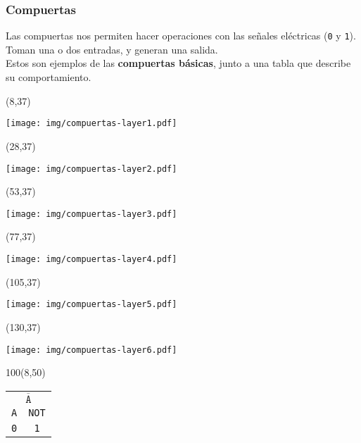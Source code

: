 \documentclass[aspectratio=169]{beamer}
\begin{document}
\begin{frame}[fragile,t]
    \frametitle{Compuertas}
    Las compuertas nos permiten hacer operaciones con las señales eléctricas (\texttt{0} y \texttt{1}).\\
    Toman una o dos entradas, y generan una salida.\\
    \bigskip
    Estos son ejemplos de las \textbf{compuertas básicas}, junto a una tabla que describe su comportamiento.
    \bigskip
    \begin{textblock}{16}(8,37)   \begin{center} \texttt{[image: img/compuertas-layer1.pdf]} \end{center} \end{textblock}
    \begin{textblock}{21}(28,37)  \begin{center} \texttt{[image: img/compuertas-layer2.pdf]} \end{center} \end{textblock}
    \begin{textblock}{21}(53,37)  \begin{center} \texttt{[image: img/compuertas-layer3.pdf]} \end{center} \end{textblock}
    \begin{textblock}{21}(77,37)  \begin{center} \texttt{[image: img/compuertas-layer4.pdf]} \end{center} \end{textblock}
    \begin{textblock}{21}(105,37) \begin{center} \texttt{[image: img/compuertas-layer5.pdf]} \end{center} \end{textblock}
    \begin{textblock}{21}(130,37) \begin{center} \texttt{[image: img/compuertas-layer6.pdf]} \end{center} \end{textblock}
    \begin{textblock}{100}(8,50)
    \begin{tabular}{c|c}
    \multicolumn{2}{c}{\textcolor{naranjauca}{ $\overline{\texttt{A}}$ } } \\
    \texttt{A} & \texttt{NOT} \\
    \hline
    \texttt{0} & \texttt{1} \\

\end{tabular}
\end{textblock}
\end{frame}
\end{document}
